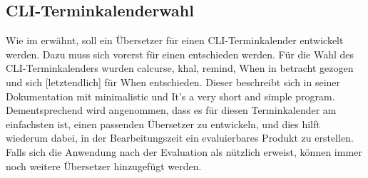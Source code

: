 \subsection{CLI-Terminkalenderwahl}\label{subsections:cli_termincalendar}%
Wie im  erwähnt, soll ein Übersetzer für einen CLI-Terminkalender entwickelt werden. Dazu muss sich vorerst für einen entschieden werden.\newline%
Für die Wahl des CLI-Terminkalenders wurden calcurse\cite{cli_calcurse}, khal\cite{cli_khal}, remind\cite{cli_remind}, When\cite{cli_when} in betracht gezogen und sich [letztendlich] für When entschieden. Dieser beschreibt sich in seiner Dokumentation mit \glqq minimalistic\grqq{} und \glqq It's a very short and simple program\grqq{}\cite{cli_when}. Dementsprechend wird angenommen, dass es für diesen Terminkalender am einfachsten ist, einen passenden Übersetzer zu entwickeln, und dies hilft wiederum dabei, in der Bearbeitungszeit ein evaluierbares Produkt zu erstellen.\newline%
%
Falls sich die Anwendung nach der Evaluation als nützlich erweist, können immer noch weitere Übersetzer hinzugefügt werden.%